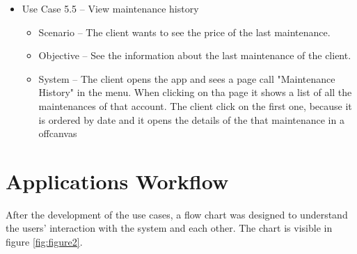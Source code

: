 \begin{itemize}
\begin{itemize}
  \end{itemize}
      \item Use Case 5.5 – View maintenance history
  \begin{itemize}
    \item Scenario – The client wants to see the price of the last maintenance.
    \item Objective – See the information about the last maintenance of the client.
    \item System – The client opens the app and sees a page call "Maintenance History" in the menu. When clicking on tha page it shows a list of all the maintenances of that account. The client click on the first one, because it is ordered by date and it opens the details of the that maintenance in a offcanvas 
  \end{itemize}
\end{itemize}
\hfill \break




\section{Applications Workflow}

After the development of the use cases, a flow chart was designed to understand the users' interaction with the system and each other. The chart is visible in figure \ref{fig:figure2}.

